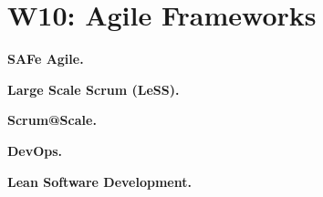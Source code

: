 \section{W10: Agile Frameworks}

\textbf{SAFe Agile.}

\textbf{Large Scale Scrum (LeSS).}

\textbf{Scrum@Scale.}

\textbf{DevOps.}

\textbf{Lean Software Development.}
